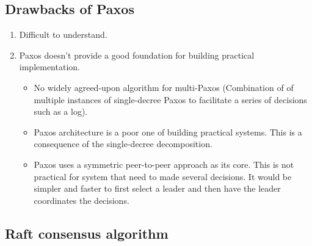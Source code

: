 \subsection{Drawbacks of Paxos}

\begin{enumerate}
\item Difficult to understand.
\item Paxos doesn't provide a good foundation for building practical implementation.
\begin{itemize}
\item No widely agreed-upon algorithm for multi-Paxos (Combination of of multiple instances of single-decree Paxos to facilitate a series of decisions such as a log).
\item Paxos architecture is a poor one of building practical systems. This is a consequence of the single-decree decomposition.
\item Paxos uses a symmetric peer-to-peer approach as its core. This is not practical for system that need to made several decisions. It would be simpler and faster to first select a leader and then have the leader coordinates the decisions. 
\end{itemize}
\end{enumerate}

\subsection{Raft consensus algorithm}

